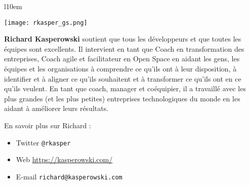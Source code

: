 \documentclass[paper=6in:9in,pagesize=pdftex,headinclude=on,footinclude=on,12pt]{scrbook}
\begin{document}
\begin{wrapfigure}{l}{10em}
  \vspace{-2em}
  \begin{center}
    \texttt{[image: rkasper\_gs.png]}
  \end{center}
  \vspace{-2em}
\end{wrapfigure}

\textbf{Richard Kasperowski} soutient que tous les développeurs et que toutes les équipes sont excellents. Il intervient
en tant que Coach en transformation des entreprises, Coach agile et facilitateur en Open Space en aidant les gens,
les équipes et les organisations à comprendre ce qu'ils ont à leur disposition, à identifier et à aligner ce qu'ils souhaitent
et à transformer ce qu'ils ont en ce qu'ils veulent. En tant que coach, manager et coéquipier, il a travaillé avec les
plus grandes (et les plus petites) entreprises technologiques du monde en les aidant à améliorer leurs résultats.

En savoir plus sur Richard :
\begin{itemize}
	\item Twitter \texttt{@rkasper}
	\item Web \url{https://kasperowski.com/}
	\item E-mail \texttt{richard@kasperowski.com}
\end{itemize}
\end{document}
